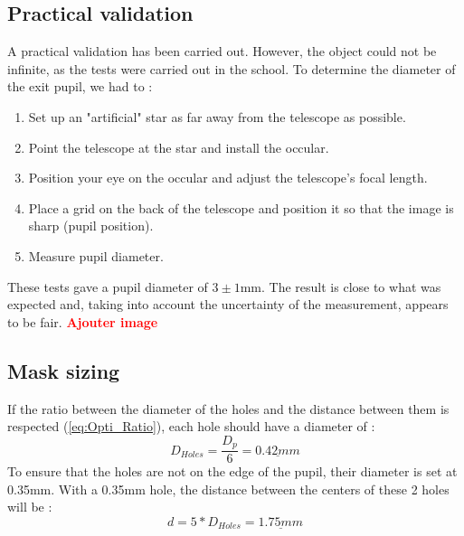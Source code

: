 \subsection{Practical validation}
A practical validation has been carried out. However, the object could not be infinite, as the tests were carried out in the school.
To determine the diameter of the exit pupil, we had to :
\begin{enumerate}
    \item Set up an "artificial" star as far away from the telescope as possible.
    \item Point the telescope at the star and install the occular.
    \item Position your eye on the occular and adjust the telescope's focal length.
    \item Place a grid on the back of the telescope and position it so that the image is sharp (pupil position).
    \item Measure pupil diameter.
\end{enumerate}
These tests gave a pupil diameter of $3 \pm 1$mm. The result is close to what was expected and, taking into account
the uncertainty of the measurement, appears to be fair.
\newline
\textbf{\textcolor{red}{Ajouter image}}
\subsection{Mask sizing}
If the ratio between the diameter of the holes and the distance between them is respected (\ref{eq:Opti_Ratio}), each hole should have a diameter of :
\begin{equation}\label{eq:Opti_ratio}
    D_{Holes} = \frac{D_p}{6} = \underline{0.42mm}
\end{equation}
To ensure that the holes are not on the edge of the pupil, their diameter is set at 0.35mm. With a 0.35mm hole, the distance
between the centers of these 2 holes will be :
\begin{equation}
    d = 5*D_{Holes} = \underline{1.75mm}
\end{equation}
